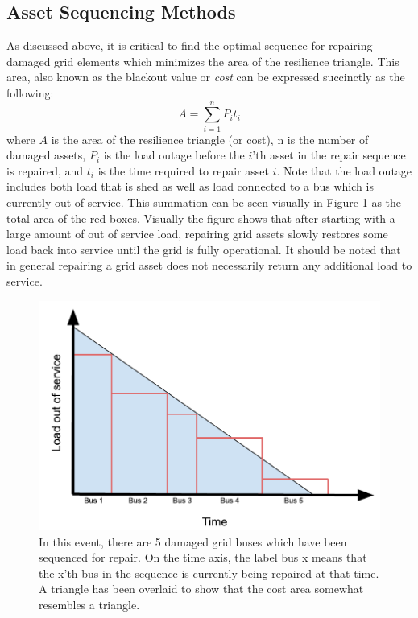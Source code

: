 \documentclass[12pt]{article}
\begin{document}
\subsection{Asset Sequencing Methods}
As discussed above, it is critical to find the optimal sequence for repairing damaged grid elements which minimizes the area of the resilience triangle. This area, also known as the blackout value or \textit{cost} can be expressed succinctly as the following:
\begin{equation} 
    A=\sum_{i=1}^{n}{P_it_i}
    \label{eq:cost}
\end{equation}
where $A$ is the area of the resilience triangle (or cost), n is the number of damaged assets, $P_i$ is the load outage before the $i$’th asset in the repair sequence is repaired, and $t_i$ is the time required to repair asset $i$. Note that the load outage includes both load that is shed as well as load connected to a bus which is currently out of service. This summation can be seen visually in Figure \ref{fig:costfigure} as the total area of the red boxes.  Visually the figure shows that after starting with a large amount of out of service load, repairing grid assets slowly restores some load back into service until the grid is fully operational. It should be noted that in general repairing a grid asset does not necessarily return any additional load to service. \par
\begin{figure}[ht]
    \centering %
    \includegraphics[scale = 0.9]{costfigure.pdf}
    \caption[Cost (blackout value) formula visualized]{In this event, there are 5 damaged grid buses which have been sequenced for repair. On the time axis, the label bus x means that the x'th bus in the sequence is currently being repaired at that time. A triangle has been overlaid to show that the cost area somewhat resembles a triangle.}
    \label{fig:costfigure}
\end{figure}
\end{document}
